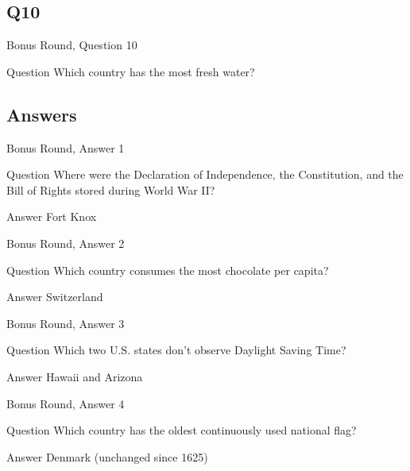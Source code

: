 \documentclass[11pt]{beamer}
\begin{document}
\subsection*{Q10}
\begin{frame}[t]{Bonus Round, Question 10}
\vspace{2em}
\begin{block}{Question}
Which country has the most fresh water\@?
\end{block}
\end{frame}
    
\subsection{Answers}

\begin{frame}[t]{Bonus Round, Answer 1}
\vspace{2em}
\begin{block}{Question}
Where were the Declaration of Independence, the Constitution, and the Bill of Rights stored during World War II\@?
\end{block}
\pause{}
\begin{block}{Answer}
Fort Knox
\end{block}
\end{frame}
    

\begin{frame}[t]{Bonus Round, Answer 2}
\vspace{2em}
\begin{block}{Question}
Which country consumes the most chocolate per capita\@?
\end{block}
\pause{}
\begin{block}{Answer}
Switzerland
\end{block}
\end{frame}
    

\begin{frame}[t]{Bonus Round, Answer 3}
\vspace{2em}
\begin{block}{Question}
Which two U.S. states don't observe Daylight Saving Time\@?
\end{block}
\pause{}
\begin{block}{Answer}
Hawaii and Arizona
\end{block}
\end{frame}
    

\begin{frame}[t]{Bonus Round, Answer 4}
\vspace{2em}
\begin{block}{Question}
Which country has the oldest continuously used national flag\@?
\end{block}
\pause{}
\begin{block}{Answer}
Denmark (unchanged since 1625)
\end{block}
\end{frame}
    
\end{document}
